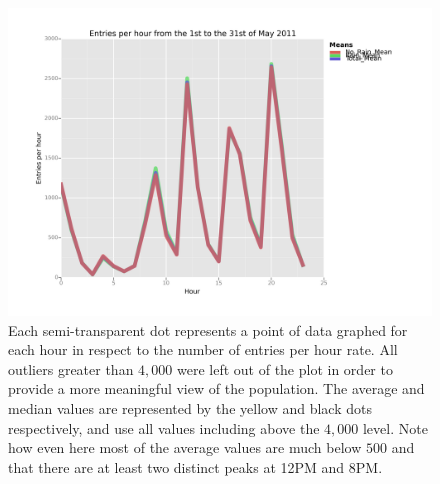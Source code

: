 \documentclass{article}
\numberwithin{questionCtr}{section}
\numberwithin{problemCtr}{section}
\begin{document}
\begin{figure}[ht]
  \centering
  \includegraphics[width=\textwidth]{entries_per_hour.png}
  \caption{Each semi-transparent dot represents a point of data graphed for each
    hour in respect to the number of entries per hour rate.  All outliers
    greater than $4,000$  were left out of the plot in order to provide a more
    meaningful view of the population.  The average and median values are
    represented by the yellow and black dots respectively, and use all values
    including above the $4,000$ level.  Note how even here most of the average
    values are much below $500$ and that there are at least two distinct peaks
  at 12PM and 8PM.}
  \label{fig:bar-graph-ccs-vs-ics-times}
\end{figure}



\printbibliography[keyword=Python , title={Python references}]
\printbibliography[keyword=SQL , title={SQL references}]
\printbibliography[keyword=Udacity , title={Udacity references}]
\printbibliography[keyword=statistics , title={Statistics references}]
\printbibliography[keyword=machine.learning, title={Machine Learning references}]
\printbibliography[keyword=ggplot , title={ggplot references}]
\printbibliography[keyword=other , title={other references}]
\end{document}
